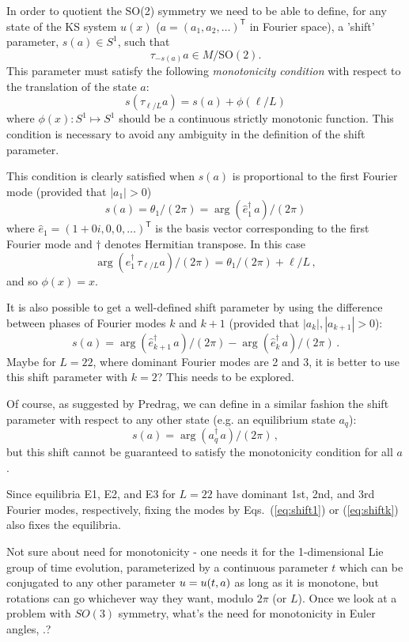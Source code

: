 \medskip{}
In order to quotient the SO(2) symmetry we need to be able to define,
for any state of the KS system $u(x)$
($a = (a_1, a_2, \ldots)^\mathsf{T}$ in Fourier space),
a 'shift' parameter, $s(a) \in S^1 $, such that
\[ \tau_{-s(a)} a \in M/\mathrm{SO}(2). \]
This parameter must satisfy the following {\em monotonicity condition} with
respect to the translation of the state $a$:
\[ s(\tau_{\ell/L}a) = s(a) + \phi(\ell/L) \]
where $\phi(x): S^1 \mapsto S^1$ should be a continuous strictly monotonic function.
This condition is necessary to avoid any ambiguity in the definition of
the shift parameter.

This condition is clearly satisfied when $s(a)$ is proportional to
the first Fourier mode (provided that $|a_1| > 0$)
\begin{equation}
  s(a) =  \theta_1/(2\pi) = \arg(\hat{e}_1^\dagger\,a)/(2\pi)
\label{eq:shift1} \end{equation}
where $\hat{e}_1 = (1+0i, 0, 0, \ldots)^\mathsf{T}$ is the basis vector corresponding
to the first Fourier mode and $\dagger$ denotes Hermitian transpose.
In this case
\[ \arg (e_1^\dagger\,\tau_{\ell/L}a)/(2\pi) = \theta_1/(2\pi) + \ell/L\,, \]
and so $\phi(x) = x$.

It is also possible to get a well-defined shift parameter by
using the difference between phases of Fourier modes $k$ and $k+1$ (provided
that $|a_k|, |a_{k+1}| > 0$):
\begin{equation}
  s(a) = \arg(\hat{e}_{k+1}^\dagger\,a)/(2\pi) -
  \arg(\hat{e}_{k}^\dagger\,a)/(2\pi)\,.
  \label{eq:shiftk} \end{equation}
Maybe for $L = 22$, where dominant Fourier modes are 2 and 3, it is better to use
this shift parameter with $k = 2$?  This needs to be explored.

Of course, as suggested by Predrag, we can define in a similar
fashion the shift parameter with respect to any other
state (e.g. an equilibrium state $a_q$):
\[ s(a) = \arg(a_q^\dagger\, a)/(2\pi)\,, \]
but this shift cannot be guaranteed to satisfy the
monotonicity condition for all $a$.

Since equilibria E1, E2, and E3 for $L = 22$ have dominant
1st, 2nd, and 3rd Fourier modes, respectively, fixing the modes by
Eqs.~(\ref{eq:shift1}) or (\ref{eq:shiftk}) also fixes the equilibria.


\medskip{}
\medskip{}
Not sure about need for monotonicity - one needs it for the 1-dimensional
Lie group of time evolution, parameterized by a continuous parameter $t$
which can be conjugated to any other parameter $u = u(t,a)$ as long
as it is monotone, but rotations can go whichever way they want, modulo
$2\pi$ (or $L$). Once we look at a problem with $SO(3)$ symmetry, what's the
need for monotonicity in Euler angles, \etc.?

